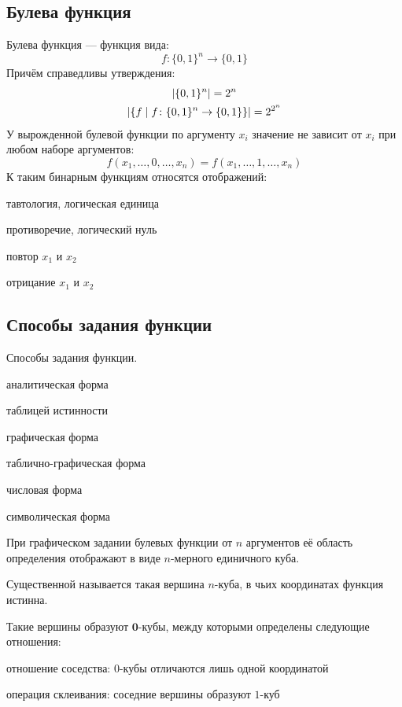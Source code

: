 \subsection{Булева функция}

{\bold Булева функция} --- функция вида:
$$f\colon\{0,1\}^n\to\{0,1\}$$
Причём справедливы утверждения:
$$\begin{gathered}
\left|\{0,1\}^n\right|=2^n\\
\left|\{f\mid f\colon\{0,1\}^n\to\{0,1\}\}\right|=2^{2^n}
\end{gathered}$$
У {\bold вырожденной} булевой функции по аргументу $x_i$ значение {\ital не зависит} от $x_i$ при любом наборе аргументов:
$$f(x_1,\dots,0,\dots,x_n)=f(x_1,\dots,1,\dots,x_n)$$
К таким бинарным функциям относятся { отображений}:
\begin{list*}
\item {\bold тавтология}, логическая единица
\item {\bold противоречие}, логический нуль
\item {\bold повтор} $x_1$ и $x_2$
\item {\bold отрицание} $x_1$ и $x_2$
\end{list*}

\subsection{Способы задания функции}

\begin{theorem}
{\bold Способы задания функции.}
\begin{list*}
\item аналитическая форма
\item таблицей истинности
\item графическая форма
\item таблично-графическая форма
\item числовая форма
\item символическая форма
\end{list*}
\end{theorem}

При {\bold графическом} задании булевых функции от $n$ аргументов её область определения отображают в виде $n$-мерного {\ital единичного куба}.

{\bold Существенной} называется такая вершина $n$-куба, в чьих координатах функция {\ital истинна}.

Такие вершины образуют {\bold $\symbf{0}$-кубы}, между которыми определены следующие отношения:
\begin{list*}
\item {\bold отношение соседства}: $0$-кубы отличаются лишь {\ital одной} координатой
\item {\bold операция склеивания}: соседние вершины образуют $1$-куб
\end{list*}


